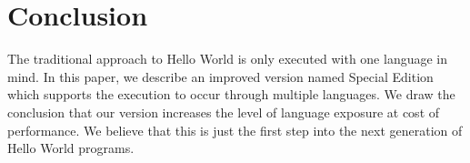 \documentclass[11pt]{article}
\begin{document}
\section{Conclusion}
The traditional approach to Hello World is only executed with one language in mind. In this paper, we describe an improved version named Special Edition which supports the execution to occur through multiple languages. We draw the conclusion that our version increases the level of language exposure at cost of performance. We believe that this is just the first step into the next generation of Hello World programs.





\end{document}
